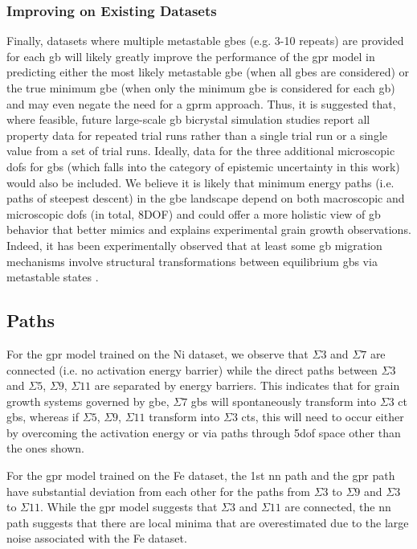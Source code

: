 \documentclass[final,twocolumn,12pt]{elsarticle}
\begin{document}
	\subsubsection{Improving on Existing Datasets} \label{sec:discuss:lit:improve}
	Finally, datasets where multiple metastable \glspl{gbe} (e.g. 3-10 repeats) are provided for each \gls{gb} will likely greatly improve the performance of the \gls{gpr} model in predicting either the most likely metastable \gls{gbe} (when all \glspl{gbe} are considered) or the true minimum \gls{gbe} (when only the minimum \gls{gbe} is considered for each \gls{gb}) and may even negate the need for a \gls{gprm} approach. Thus, it is suggested that, where feasible, future large-scale \gls{gb} bicrystal simulation studies report all property data for repeated trial runs rather than a single trial run or a single value from a set of trial runs. Ideally, data for the three additional microscopic \glspl{dof} for \glspl{gb} (which falls into the category of epistemic uncertainty in this work) would also be included. We believe it is likely that minimum energy paths (i.e. paths of steepest descent) in the \gls{gbe} landscape depend on both macroscopic and microscopic \glspl{dof} (in total, 8DOF) and could offer a more holistic view of \gls{gb} behavior that better mimics and explains experimental grain growth observations. Indeed, it has been experimentally observed that at least some \gls{gb} migration mechanisms involve structural transformations between equilibrium \glspl{gb} via metastable states \cite{weiDirectImagingAtomistic2021}.
	 
    \subsection{ Paths} \label{sec:discuss:path}
     For the \gls{gpr} model trained on the Ni \citet{olmstedSurveyComputedGrain2009} dataset, we observe that $\Sigma3$ and $\Sigma7$ are connected (i.e. no activation energy barrier) while the direct paths between $\Sigma3$ and $\Sigma5$, $\Sigma9$, $\Sigma11$ are separated by energy barriers. This indicates that for grain growth systems governed by \gls{gbe}, $\Sigma7$ \glspl{gb} will spontaneously transform into $\Sigma3$ \gls{ct} \glspl{gb}, whereas if $\Sigma5$, $\Sigma9$, $\Sigma11$ transform into $\Sigma3$ \glspl{ct}, this will need to occur either by overcoming the activation energy or via paths through \gls{5dof} space other than the ones shown.
     
     For the \gls{gpr} model trained on the Fe \citet{kimPhasefieldModeling3D2014} dataset, the 1st \gls{nn} path and the \gls{gpr} path have substantial deviation from each other for the paths from $\Sigma3$ to $\Sigma9$ and $\Sigma3$ to $\Sigma11$. While the \gls{gpr} model suggests that $\Sigma3$ and $\Sigma11$ are connected, the \gls{nn} path suggests that there are local minima that are overestimated due to the large noise associated with the Fe dataset.
\end{document}
